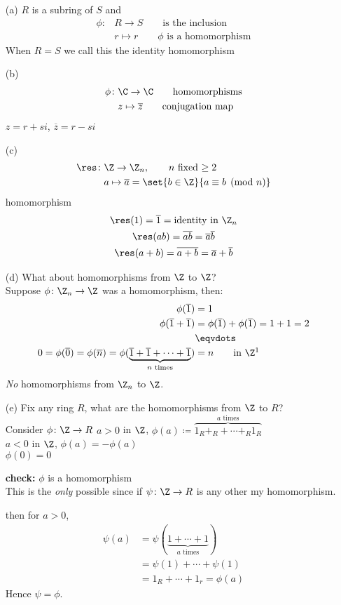 \ex
\begin{enumerate} %
\item[(a)] $R$ is a subring of $S$ and
\begin{align*}
\phi\colon & R \to S \qquad\text{is the inclusion} \\
& r \mapsto r \qquad\text{$\phi$ is a homomorphism}
\end{align*}
When $R=S$ we call this the identity homomorphism
\item[(b)]%
\begin{align*}
\phi\colon & \C \to \C \qquad\text{homomorphisms} \\
& z \mapsto \overline{z} \qquad\text{conjugation map}
\end{align*}
$z=r+si$, $\overline{z}=r-si$
\item[(c)]%
\begin{align*}
\res\colon & \Z \to \Z_n, \qquad\text{$n$ fixed $\geq2$} \\
& a \mapsto \overline{a}=\set{b\in\Z}{a\equiv b\pmod n}
\end{align*}
homomorphism
\begin{gather*}
\res(1) = \overline1 = \text{identity in $\Z_n$} \\
\res(ab) = \overline{ab} = \overline{a}\overline{b} \\
\res(a+b) = \overline{a+b} = \overline{a}+\overline{b}
\end{gather*}
\item[(d)] What about homomorphisms from $\Z$ to $\Z$? \\
Suppose $\phi\colon\Z_n\to\Z$ was a homomorphism, then:
\begin{align*}
\phi(\overline1) &= 1 \\
\phi(\overline1+\overline1) &= \phi(\overline1)+\phi(\overline1)=1+1=2 \\
&\eqvdots \\
0 = \phi(\overline0) = \phi(\overline n) = \phi(\underbrace{\overline1+\overline1+\dotsb+\overline1}_{\text{$n$ times}}) &= n \qquad\text{in $\Z$}\footnotemark
\end{align*}
\emph{No} homomorphisms from $\Z_n$ to $\Z$.
\item[(e)] Fix any ring $R$, what are the homomorphisms from $\Z$ to $R$? \\
Consider $\phi\colon\Z\to R$
$a>0$ in $\Z$, $\phi(a)\coloneqq\overbrace{1_R+_R+\dotsb+_R1_R}^{\text{$a$ times}}$ \\
$a<0$ in $\Z$, $\phi(a)=-\phi(a)$ \\
$\phi(0)=0$

\textbf{check:} $\phi$ is a homomorphism \\
This is the \emph{only} possible since if 
$\psi\colon\Z\to R$ is any other my homomorphism.

then for $a>0$,
\begin{align*}
\psi(a) &= \psi(\underbrace{1+\dotsb+1}_{\text{$a$ times}}) \\
&= \psi(1) + \dotsb + \psi(1) \\
&= 1_R + \dotsb + 1_r = \phi(a)
\end{align*}
Hence $\psi=\phi$.
\end{enumerate}
